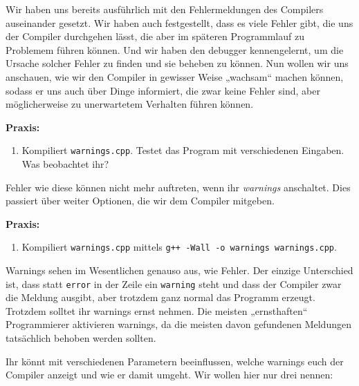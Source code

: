 
Wir haben uns bereits ausführlich mit den Fehlermeldungen des Compilers
auseinander gesetzt. Wir haben auch festgestellt, dass es viele Fehler gibt,
die uns der Compiler durchgehen lässt, die aber im späteren Programmlauf zu
Problemem führen können. Und wir haben den debugger kennengelernt, um die
Ursache solcher Fehler zu finden und sie beheben zu können. Nun wollen wir uns
anschauen, wie wir den Compiler in gewisser Weise „wachsam“ machen können,
sodass er uns auch über Dinge informiert, die zwar keine Fehler sind, aber
möglicherweise zu unerwartetem Verhalten führen können.

\textbf{Praxis:}
\begin{enumerate}
    \item Kompiliert \texttt{warnings.cpp}. Testet das Program mit
        verschiedenen Eingaben. Was beobachtet ihr?
\end{enumerate}

Fehler wie diese können nicht mehr auftreten, wenn ihr \emph{warnings}
anschaltet. Dies passiert über weiter Optionen, die wir dem Compiler mitgeben.

\textbf{Praxis:}
\begin{enumerate}[resume]
    \item Kompiliert \texttt{warnings.cpp} mittels \texttt{g++ -Wall -o
        warnings warnings.cpp}.
\end{enumerate}

Warnings sehen im Wesentlichen genauso aus, wie Fehler. Der einzige Unterschied
ist, dass statt \texttt{error} in der Zeile ein \texttt{warning} steht und dass
der Compiler zwar die Meldung ausgibt, aber trotzdem ganz normal das Programm
erzeugt. Trotzdem solltet ihr warnings ernst nehmen. Die meisten „ernsthaften“
Programmierer aktivieren warnings, da die meisten davon gefundenen Meldungen
tatsächlich behoben werden sollten.

Ihr könnt mit verschiedenen Parametern beeinflussen, welche warnings euch der
Compiler anzeigt und wie er damit umgeht. Wir wollen hier nur drei nennen:

